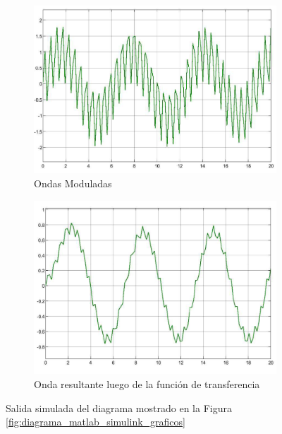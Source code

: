 \begin{figure}[htbp]
    \centering
    \begin{subfigure}[b]{0.45\textwidth}
        \centering
        \includegraphics[width=\textwidth]{fig/especifico_2/onda_modulada.pdf}
        \caption{Ondas Moduladas}
        \label{fig:onda_modulada}
    \end{subfigure}
    \hfill
    \begin{subfigure}[b]{0.45\textwidth}
        \centering
        \includegraphics[width=\textwidth]{fig/especifico_2/onda_filtrada.pdf}
        \caption{Onda resultante luego de la función de transferencia}
        \label{fig:onda_filtrada}
    \end{subfigure}
    \caption{Salida simulada del diagrama mostrado en la Figura \ref{fig:diagrama_matlab_simulink_graficos}}
    \label{fig:salida_resultante_diagrama_graficos}
\end{figure}


